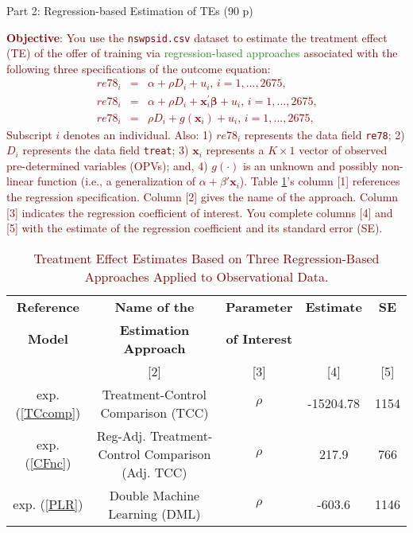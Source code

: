 
\begin{center}
{\LARGE Part 2: Regression-based Estimation of TEs (90 p)}
\end{center}

\noindent \textcolor{Maroon}{\textbf{Objective}: You use the \texttt{nswpsid.csv} dataset to estimate the treatment effect (TE) of the offer of training via \textcolor{ForestGreen}{regression-based approaches} associated with the following three specifications of the outcome equation:
\begin{eqnarray}
re78_{i} &=&\alpha +\rho D_{i}+u_{i}\text{, }i=1,...,2675\text{,}
\label{TCcomp} \\
re78_{i} &=&\alpha +\rho D_{i}+\mathbf{x}_{i}^{\prime }\mathbf{\beta }+u_{i}\text{, }i=1,...,2675\text{,}  \label{CFnc} \\
re78_{i} &=&\rho D_{i}+g(\mathbf{x}_{i})+u_{i}\text{, }i=1,...,2675\text{,}  \label{PLR} 
\end{eqnarray}
\noindent Subscript $i$ denotes an individual.  Also: 1) $re78_{i}$ represents the data field \texttt{re78}; 2) $D_{i}$ represents the data field \texttt{treat}; 3) $\mathbf{x}_{i}$ represents a $K\times 1$ vector of observed pre-determined variables (OPVs); and, 4) $g(\cdot)$ is an unknown and possibly non-linear function (i.e., a generalization of $\alpha + \beta' \mathbf{x}_{i}$). Table \ref{tab:reg-specs}'s column [1] references the regression specification. Column [2] gives the name of the approach. Column [3] indicates the regression coefficient of interest. You complete columns [4] and [5] with the estimate of the regression coefficient and its standard error (SE).}

\begin{table}[ht]
\centering
\colorbox{lightmaroon}{
{\color{Maroon}
\begin{tabular}{ccccc}
\hline
\textbf{Reference} & \multicolumn{1}{c}{\textbf{Name of the }} & \textbf{Parameter} & \multicolumn{1}{c}{\textbf{Estimate}} & \textbf{SE} \\
\textbf{Model} & \multicolumn{1}{c}{\textbf{Estimation Approach}}            & \textbf{of Interest} &  &  \\ \hline
[1] & [2] & [3] & [4] & [5]  \\ \hline
exp. (\ref{TCcomp})               & Treatment-Control Comparison (TCC)               & $\rho$  & -15204.78  & 1154   \\
exp. (\ref{CFnc})                 & Reg-Adj. Treatment-Control Comparison (Adj. TCC) & $\rho$  &  217.9     & 766    \\
exp. (\ref{PLR})                  & Double Machine Learning (DML)                    & $\rho$  & -603.6     & 1146   \\
\hline
\end{tabular}}}
\caption{\textcolor{Maroon}{Treatment Effect Estimates Based on Three Regression-Based Approaches Applied to Observational Data.}}
\label{tab:reg-specs}
\end{table}

